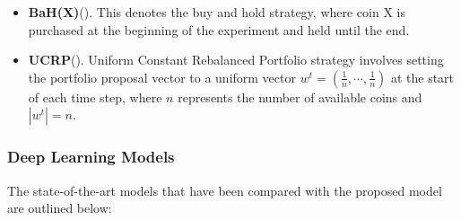 \begin{itemize}
	\item \textbf{BaH(X)}(\citet{li2014online}). This denotes the buy and hold strategy, where coin X is purchased at the beginning of the experiment and held until the end.
	\item \textbf{UCRP}(\citet{li2014online}). Uniform Constant Rebalanced Portfolio strategy involves setting the portfolio proposal vector to a uniform vector $w^t=(\frac{1}{n}, \cdots, \frac{1}{n})$ at the start of each time step, where $n$ represents the number of available coins and $|w^t| = n$.	
%
\end{itemize}

\subsubsection{Deep Learning Models}
The state-of-the-art models that have been compared with the proposed model are outlined below:

